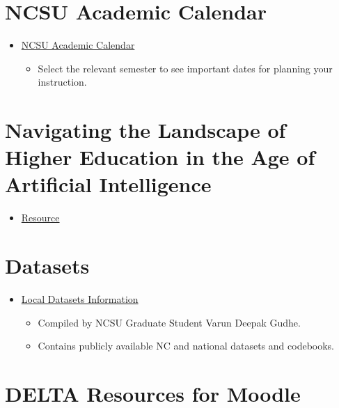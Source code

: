 \documentclass[
]{book}
\providecommand{\tightlist}{%
  \setlength{\itemsep}{0pt}\setlength{\parskip}{0pt}}
\begin{document}
\section{NCSU Academic Calendar}\label{ncsu-academic-calendar}

\begin{itemize}
\tightlist
\item
  \href{https://studentservices.ncsu.edu/calendars/academic/}{NCSU Academic Calendar}

  \begin{itemize}
  \tightlist
  \item
    Select the relevant semester to see important dates for planning your instruction.
  \end{itemize}
\end{itemize}

\section{Navigating the Landscape of Higher Education in the Age of Artificial Intelligence}\label{navigating-the-landscape-of-higher-education-in-the-age-of-artificial-intelligence}

\begin{itemize}
\tightlist
\item
  \href{https://provost.ncsu.edu/ofe/navigating-the-landscape-of-higher-education-in-the-age-of-artificial-intelligence/}{Resource}
\end{itemize}

\section{Datasets}\label{datasets}

\begin{itemize}
\tightlist
\item
  \href{https://github.com/varundeepakgudhe/Data_Science_Academy}{Local Datasets Information}

  \begin{itemize}
  \tightlist
  \item
    Compiled by NCSU Graduate Student Varun Deepak Gudhe.
  \item
    Contains publicly available NC and national datasets and codebooks.
  \end{itemize}
\end{itemize}

\section{DELTA Resources for Moodle}\label{delta-resources-for-moodle}
\end{document}
